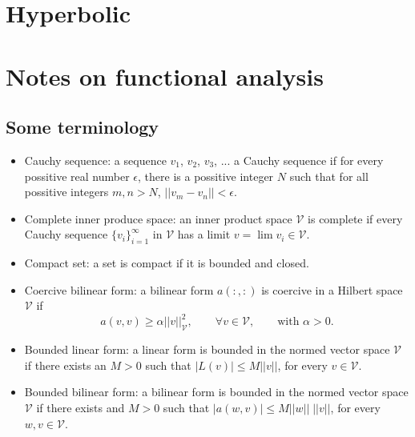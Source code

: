 \documentclass[oneside,a4paper,11pt]{report}
\begin{document}
\chapter{Hyperbolic}

\appendix

\chapter{Notes on functional analysis}

\section{Some terminology}
\begin{itemize}
    \item Cauchy sequence: a sequence $v_1$, $v_2$, $v_3$, ... \@is a Cauchy sequence if for every possitive real number $\epsilon$, there is a possitive integer $N$ such that for all possitive integers $m,n>N$, $||v_m-v_n||<\epsilon$. 
    \item Complete inner produce space: an inner product space $\mathcal{V}$ is complete if every Cauchy sequence $\{v_i\}_{i=1}^\infty$ in $\mathcal{V}$ has a limit $v = \lim v_i \in \mathcal{V}$.
    \item Compact set: a set is compact if it is bounded and closed.
    \item Coercive bilinear form: a bilinear form $a(:,:)$ is coercive in a Hilbert space $\mathcal{V}$ if 
    \begin{equation}
        a(v,v) \ge \alpha ||v||_\mathcal{V}^2, \qquad \forall v \in \mathcal{V}, \qquad \text{with }\alpha > 0.
    \end{equation}
    \item Bounded linear form: a linear form is bounded in the normed vector space $\mathcal{V}$ if there exists an $M>0$ such that $|L(v)| \le M ||v||$, for every $v \in \mathcal{V}$. 
    \item Bounded bilinear form: a bilinear form is bounded in the normed vector space $\mathcal{V}$ if there exists and $M>0$ such that $|a(w,v)| \le M ||w||\;||v||$, for every $w,v \in \mathcal{V}$.
\end{itemize}
\end{document}
